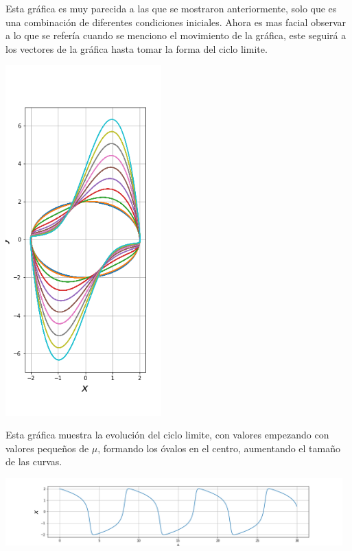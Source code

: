 \documentclass{article}
\begin{document}
Esta gráfica es muy parecida a las que se mostraron anteriormente, solo que es una combinación de diferentes condiciones iniciales. Ahora es mas facial observar a lo que se refería cuando se menciono el movimiento de la gráfica, este seguirá a los vectores de la gráfica hasta tomar la forma del ciclo limite. 

\begin{center}
	\includegraphics[width=6cm]{SegundaFig.png}
    
\end{center}
\vspace{0.3cm}

Esta gráfica muestra la evolución del ciclo limite, con valores empezando con valores pequeños de $\mu$, formando los óvalos en el centro, aumentando el tamaño de las curvas.

\begin{center}
	\includegraphics[width=13cm]{TerceraFig.png}
    
\end{center}
\vspace{0.3cm}
\end{document}

